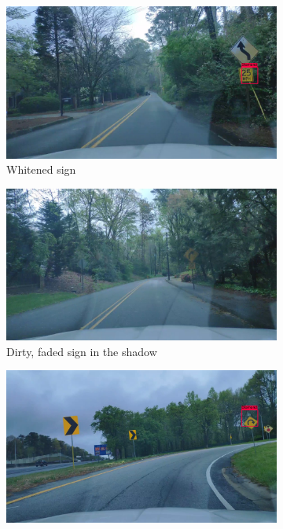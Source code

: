 \begin{figure}
  \begin{center}
    \begin{subfigure}[t]{.49\linewidth}
      \centering
      \includegraphics[width=0.99\linewidth]{figures/examples/westwestley/FN/FN01.jpg}
      \caption{Whitened sign}
      \label{fig:wwWhiteFN}
    \end{subfigure}
    \begin{subfigure}[t]{.49\linewidth}
      \centering
      \includegraphics[width=0.99\linewidth]{figures/examples/westwestley/FN/FN02.jpg}
      \caption{Dirty, faded sign in the shadow}
      \label{fig:wwFaddedFN}
    \end{subfigure}
    \begin{subfigure}[t]{.49\linewidth}
      \centering
      \includegraphics[width=0.99\linewidth]{figures/examples/westwestley/FN/FN03.png}

\end{subfigure}
\end{center}
\end{figure}
